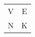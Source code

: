 \documentclass{article}
\begin{document}
	\begin{table}
		\begin{tabular}{|c|c|}
			\cellcolor{green}V & \cellcolor{blue}E\\
			\cellcolor{orange}N & \cellcolor{red}K
		\end{tabular}
	\end{table}
	
\end{document}

